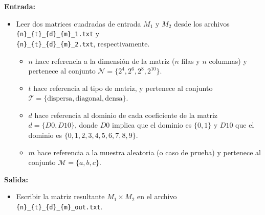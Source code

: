 \textbf{Entrada:}
\begin{itemize}
    \item Leer dos matrices cuadradas de entrada $M_1$ y $M_2$ desde los archivos \texttt{\{n\}\_\{t\}\_\{d\}\_\{m\}\_1.txt} y \\ 
    \texttt{\{n\}\_\{t\}\_\{d\}\_\{m\}\_2.txt}, respectivamente.
    \begin{itemize}
        \item $n$ hace referencia a la dimensión de la matriz ($n$ filas y $n$ columnas) y pertenece al conjunto $\mathcal{N} = \{2^4, 2^6, 2^8, 2^{10}\}$.
        \item $t$ hace referencia al tipo de matriz, y pertenece al conjunto $\mathcal{T} = \{ \text{dispersa}, \text{diagonal}, \text{densa} \}$.
        \item $d$ hace referencia al dominio de cada coeficiente de la matriz $d = \{D0, D10\}$, donde $D0$ implica que el dominio es $\{0,1\}$ y $D10$ que el dominio es $\{0,1,2,3,4,5,6,7,8,9\}$. 
        \item $m$ hace referencia a la muestra aleatoria (o caso de prueba) y pertenece al conjunto $\mathcal{M} = \{a,b,c\}$.
    \end{itemize}
\end{itemize}

\textbf{Salida:}
\begin{itemize}
    \item Escribir la matriz resultante $M_1 \times M_2$ en el archivo \texttt{\{n\}\_\{t\}\_\{d\}\_\{m\}\_out.txt}.
\end{itemize}


